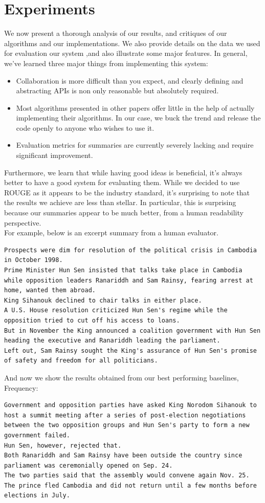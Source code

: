 \documentclass[11pt]{article}
\begin{document}
\section{Experiments}
We now present a thorough analysis of our results, and critiques of our algorithms and our implementations. We also provide details on the data we used for evaluation our system ,and also illustrate some major features. In general, we've learned three major things from implementing this system:
\begin{itemize}
\item Collaboration is more difficult than you expect, and clearly defining and abstracting APIs is non only reasonable but absolutely required.
\item Most algorithms presented in other papers offer little in the help of actually implementing their algorithms. In our case, we buck the trend and release the code openly to anyone who wishes to use it.
\item Evaluation metrics for summaries are currently severely lacking and require significant improvement.
\end{itemize}

Furthermore, we learn that while having good ideas is beneficial, it's always better to have a good system for evaluating them. While we decided to use ROUGE as it appears to be the industry standard, it's surprising to note that the results we achieve are less than stellar. In particular, this is surprising because our summaries appear to be much better, from a human readability perspective. \\

For example, below is an excerpt summary from a human evaluator.
\begin{lstlisting}[breaklines]
Prospects were dim for resolution of the political crisis in Cambodia in October 1998.
Prime Minister Hun Sen insisted that talks take place in Cambodia while opposition leaders Ranariddh and Sam Rainsy, fearing arrest at home, wanted them abroad.
King Sihanouk declined to chair talks in either place.
A U.S. House resolution criticized Hun Sen's regime while the opposition tried to cut off his access to loans.
But in November the King announced a coalition government with Hun Sen heading the executive and Ranariddh leading the parliament.
Left out, Sam Rainsy sought the King's assurance of Hun Sen's promise of safety and freedom for all politicians.
\end{lstlisting}

And now we show the results obtained from our best performing baselines, Frequency:
\begin{lstlisting}[breaklines]
Government and opposition parties have asked King Norodom Sihanouk to host a summit meeting after a series of post-election negotiations between the two opposition groups and Hun Sen's party to form a new government failed.
Hun Sen, however, rejected that.
Both Ranariddh and Sam Rainsy have been outside the country since parliament was ceremonially opened on Sep. 24.
The two parties said that the assembly would convene again Nov. 25.
The prince fled Cambodia and did not return until a few months before elections in July.
\end{lstlisting}
\end{document}
